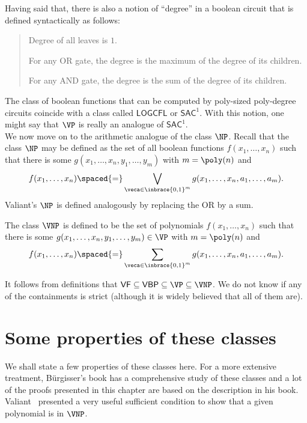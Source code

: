 Having said that, there is also a notion of ``degree'' in a boolean circuit that is defined syntactically as follows:
 \begin{quote}
   Degree of all leaves is $1$. 

   For any OR gate, the degree is the maximum of the degree of its children. 

   For any AND gate, the degree is the sum of the degree of its children. 
 \end{quote}
The class of boolean functions that can be computed by poly-sized poly-degree circuits coincide with a class called $\mathsf{LOGCFL}$ or $\mathsf{SAC}^1$. 
With this notion, one might say that $\VP$ is really an analogue of $\mathsf{SAC}^1$.\\


We now move on to the arithmetic analogue of the class $\NP$. 
Recall that the class $\NP$ may be defined as the set of all boolean functions $f(x_1,\dots, x_n)$ such that there is some $g(x_1,\dots, x_n, y_1,\dots, y_m)$ with $m = \poly(n)$ and 
\[
f(x_1,\dots, x_n)\spaced{=} \bigvee_{\veca \in \inbrace{0,1}^m}  g(x_1,\dots, x_n, a_1,\dots, a_m).
\]
Valiant's $\NP$ is defined analogously by replacing the OR by a sum. 

\begin{definition}[Valiant's $\NP$]\label{defn:vnp}
The class $\VNP$ is defined to be the set of polynomials $f(x_1,\dots, x_n)$ such that there is some $g(x_1,\dots, x_n, y_1,\dots, y_m) \in \VP$ with $m = \poly(n)$ and
\[
f(x_1,\dots, x_n)\spaced{=} \sum_{\veca \in \inbrace{0,1}^m}  g(x_1,\dots, x_n, a_1,\dots, a_m).
\]
\end{definition}

It follows from definitions that $\mathsf{VF} \subseteq \mathsf{VBP} \subseteq \VP \subseteq \VNP$. 
We do not know if any of the containments is strict (although it is widely believed that all of them are). 

\section{Some properties of these classes}

We shall state a few properties of these classes here. 
For a more extensive treatment, B\"{u}rgisser's book \cite{bur00} has a comprehensive study of these classes and a lot of the proofs presented in this chapter are based on the description in his book. \\

Valiant~\cite{v79} presented a very useful sufficient condition to show that a given polynomial is in $\VNP$. 

